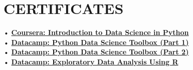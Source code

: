 \documentclass[letterpaper]{deedy-resume} %
\begin{document}
\newpage %

\begin{minipage}[t]{0.33\textwidth} %
\section{CERTIFICATES}
• \href{https://www.coursera.org/account/accomplishments/certificate/PB48PJLRP5VQ}{\bf Coursera: Introduction to Data Science in Python} \\
• \href{https://www.datacamp.com/courses/python-data-science-toolbox-part-1}{\bf Datacamp: Python Data Science Toolbox (Part 1) } \\
• \href{https://www.datacamp.com/courses/python-data-science-toolbox-part-2}{\bf Datacamp: Python Data Science Toolbox (Part 2) } \\
• \href{https://www.datacamp.com/courses/exploratory-data-analysis}{\bf Datacamp: Exploratory Data Analysis Using R
 }
\end{minipage} %
\hfill
\end{document}
